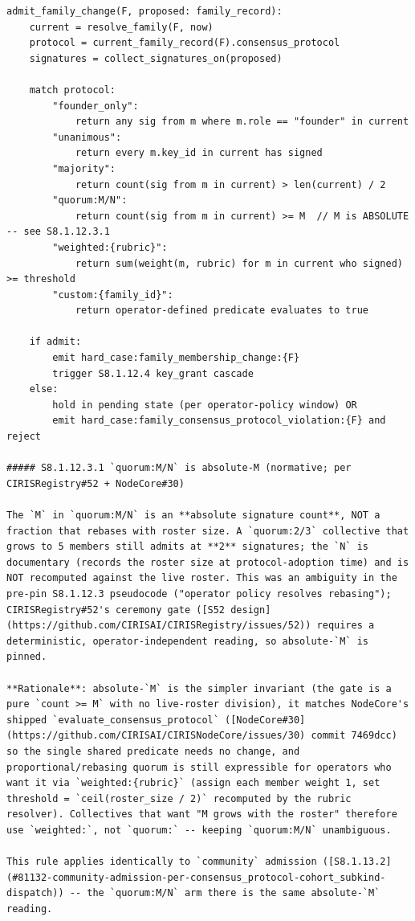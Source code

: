 \documentclass[11pt]{article}
\begin{document}
\begin{lstlisting}
admit_family_change(F, proposed: family_record):
    current = resolve_family(F, now)
    protocol = current_family_record(F).consensus_protocol
    signatures = collect_signatures_on(proposed)

    match protocol:
        "founder_only":
            return any sig from m where m.role == "founder" in current
        "unanimous":
            return every m.key_id in current has signed
        "majority":
            return count(sig from m in current) > len(current) / 2
        "quorum:M/N":
            return count(sig from m in current) >= M  // M is ABSOLUTE -- see S8.1.12.3.1
        "weighted:{rubric}":
            return sum(weight(m, rubric) for m in current who signed) >= threshold
        "custom:{family_id}":
            return operator-defined predicate evaluates to true

    if admit:
        emit hard_case:family_membership_change:{F}
        trigger S8.1.12.4 key_grant cascade
    else:
        hold in pending state (per operator-policy window) OR
        emit hard_case:family_consensus_protocol_violation:{F} and reject

##### S8.1.12.3.1 `quorum:M/N` is absolute-M (normative; per CIRISRegistry#52 + NodeCore#30)

The `M` in `quorum:M/N` is an **absolute signature count**, NOT a fraction that rebases with roster size. A `quorum:2/3` collective that grows to 5 members still admits at **2** signatures; the `N` is documentary (records the roster size at protocol-adoption time) and is NOT recomputed against the live roster. This was an ambiguity in the pre-pin S8.1.12.3 pseudocode ("operator policy resolves rebasing"); CIRISRegistry#52's ceremony gate ([S52 design](https://github.com/CIRISAI/CIRISRegistry/issues/52)) requires a deterministic, operator-independent reading, so absolute-`M` is pinned.

**Rationale**: absolute-`M` is the simpler invariant (the gate is a pure `count >= M` with no live-roster division), it matches NodeCore's shipped `evaluate_consensus_protocol` ([NodeCore#30](https://github.com/CIRISAI/CIRISNodeCore/issues/30) commit 7469dcc) so the single shared predicate needs no change, and proportional/rebasing quorum is still expressible for operators who want it via `weighted:{rubric}` (assign each member weight 1, set threshold = `ceil(roster_size / 2)` recomputed by the rubric resolver). Collectives that want "M grows with the roster" therefore use `weighted:`, not `quorum:` -- keeping `quorum:M/N` unambiguous.

This rule applies identically to `community` admission ([S8.1.13.2](#81132-community-admission-per-consensus_protocol-cohort_subkind-dispatch)) -- the `quorum:M/N` arm there is the same absolute-`M` reading.
\end{lstlisting}
\end{document}
